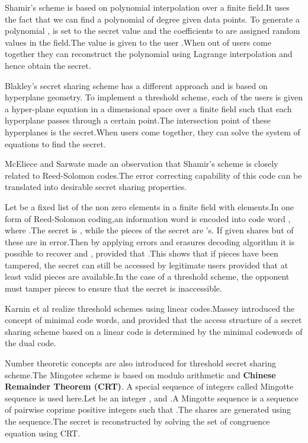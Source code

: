 \documentclass{llncs}
\begin{document}
Shamir's scheme is based on   polynomial interpolation over a finite field.It uses the fact that we can find a polynomial of degree  given  data points. To generate a polynomial , is set to the secret value and the coefficients  to  are assigned random values in the field.The value  is given to the user .When  out of  users come together they can reconstruct the polynomial using Lagrange interpolation and hence obtain the secret.

Blakley's secret sharing scheme has a different approach and is
based on hyperplane geometry. To implement a threshold scheme, each of the  users is given a hyper-plane equation in a
 dimensional space over a finite field such that each hyperplane passes through a certain point.The intersection point of these hyperplanes is the secret.When  users come together, they can solve the system of equations to find the secret.

 McEliece and Sarwate \cite{mceliece1981sharing} made an observation that Shamir's scheme is closely related to Reed-Solomon codes\cite{reed1960polynomial}.The error correcting capability of this code can be translated into desirable secret sharing properties.

Let  be a fixed list of the non zero elements in a finite field  with  elements.In one form of Reed-Solomon coding,an information word  is encoded into code word , where .The secret is , while the pieces of the secret are 's.     
 If given  shares but  of these are in error.Then by applying errors and erasures decoding algorithm it is possible to recover  and , provided that .This shows that if  pieces have been tampered, the secret can still be accessed by legitimate users provided that at least  valid pieces are available.In the case of a  threshold scheme, the opponent must tamper  pieces to ensure that the secret is inaccessible.
       
 Karnin et al \cite{karnin1983} realize threshold schemes using linear codes.Massey \cite{massey1993minimal} introduced the concept of minimal code words, and provided that the access structure of a secret sharing scheme based on a  linear code is determined by the minimal codewords of the dual code.
       


Number theoretic concepts are also introduced for threshold secret sharing scheme.The Mingotee scheme\cite{mignotte1983} is based on modulo arithmetic and \textbf{Chinese Remainder Theorem (CRT)}. A special sequence of integers called Mingotte sequence is used here.Let  be an integer  , and .A  Mingotte sequence is a sequence of pairwise coprime positive integers  such that .The shares are generated using the sequence.The secret is reconstructed by solving the set of congruence equation using CRT.
\end{document}
